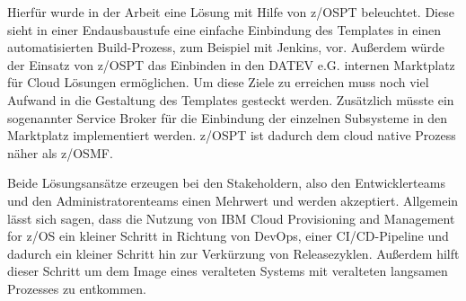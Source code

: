 Hierfür wurde in der Arbeit eine Lösung mit Hilfe von z/OSPT beleuchtet.
Diese sieht in einer Endausbaustufe eine einfache Einbindung des Templates in einen automatisierten Build-Prozess, zum Beispiel mit Jenkins, vor.
Außerdem würde der Einsatz von z/OSPT das Einbinden in den DATEV e.G. internen \glqq Marktplatz\grqq{} für Cloud Lösungen ermöglichen.
Um diese Ziele zu erreichen muss noch viel Aufwand in die Gestaltung des Templates gesteckt werden.
Zusätzlich müsste ein sogenannter \glqq Service Broker\grqq{} für die Einbindung der einzelnen Subsysteme in den \glqq Marktplatz\grqq{} implementiert werden.
z/OSPT ist dadurch dem cloud native Prozess näher als z/OSMF.

Beide Lösungsansätze erzeugen bei den Stakeholdern, also den Entwicklerteams und den Administratorenteams einen Mehrwert und werden akzeptiert.
Allgemein lässt sich sagen, dass die Nutzung von \glqq IBM Cloud Provisioning and Management for z/OS\grqq{} ein kleiner Schritt in Richtung von DevOps, einer CI/CD-Pipeline und dadurch ein kleiner Schritt hin zur Verkürzung von Releasezyklen.
Außerdem hilft dieser Schritt um dem Image eines veralteten Systems mit veralteten langsamen Prozesses zu entkommen.